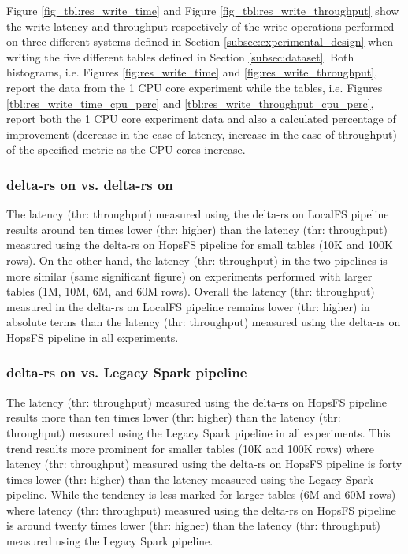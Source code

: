 Figure \ref{fig_tbl:res_write_time} and Figure \ref{fig_tbl:res_write_throughput} show the write latency and throughput respectively of the write operations performed on three different systems defined in Section \ref{subsec:experimental_design} when writing the five different tables defined in Section \ref{subsec:dataset}. Both histograms, i.e. Figures \ref{fig:res_write_time} and \ref{fig:res_write_throughput}, report the data from the 1 \gls{CPU} core experiment while the tables, i.e. Figures \ref{tbl:res_write_time_cpu_perc} and \ref{tbl:res_write_throughput_cpu_perc}, report both the 1 \gls{CPU} core experiment data and also a calculated percentage of improvement (decrease in the case of latency, increase in the case of throughput) of the specified metric as the \gls{CPU} cores increase.

\subsubsection*{delta-rs on  vs. delta-rs on }

The latency (thr: throughput) measured using the delta-rs on \gls{LocalFS} pipeline results around ten times lower (thr: higher) than the latency (thr: throughput) measured using the delta-rs on \gls{HopsFS} pipeline for small tables (10K and 100K rows). On the other hand, the latency (thr: throughput) in the two pipelines is more similar (same significant figure) on experiments performed with larger tables (1M, 10M, 6M, and 60M rows). Overall the latency (thr: throughput) measured in the delta-rs on \gls{LocalFS} pipeline remains lower (thr: higher) in absolute terms than the latency (thr: throughput) measured using the delta-rs on \gls{HopsFS} pipeline in all experiments.

\subsubsection*{delta-rs on  vs. Legacy Spark pipeline}

The latency (thr: throughput) measured using the delta-rs on \gls{HopsFS} pipeline results more than ten times lower (thr: higher) than the latency (thr: throughput) measured using the Legacy Spark pipeline in all experiments. This trend results more prominent for smaller tables (10K and 100K rows) where latency (thr: throughput) measured using the delta-rs on \gls{HopsFS} pipeline is forty times lower (thr: higher) than the latency measured using the Legacy Spark pipeline. While the tendency is less marked for larger tables (6M and 60M rows) where latency (thr: throughput) measured using the delta-rs on \gls{HopsFS} pipeline is around twenty times lower (thr: higher) than the latency (thr: throughput) measured using the Legacy Spark pipeline.

